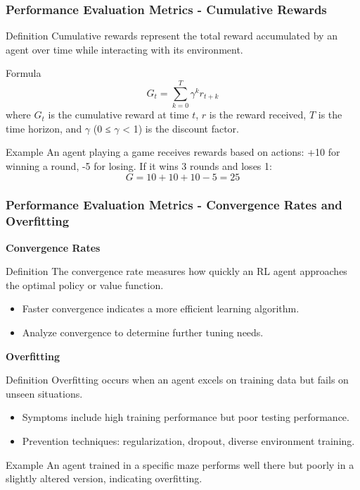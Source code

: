 \documentclass[aspectratio=169]{beamer}
\begin{document}
\begin{frame}[fragile]
    \frametitle{Performance Evaluation Metrics - Cumulative Rewards}
    \begin{block}{Definition}
        Cumulative rewards represent the total reward accumulated by an agent over time while interacting with its environment. 
    \end{block}
    
    \begin{block}{Formula}
        \begin{equation}
            G_t = \sum_{k=0}^{T} \gamma^k r_{t+k}
        \end{equation}
        where $G_t$ is the cumulative reward at time $t$, $r$ is the reward received, $T$ is the time horizon, and $\gamma$ (0 ≤ $\gamma$ < 1) is the discount factor.
    \end{block}
    
    \begin{block}{Example}
        An agent playing a game receives rewards based on actions: +10 for winning a round, -5 for losing. If it wins 3 rounds and loses 1:
        \begin{equation}
            G = 10 + 10 + 10 - 5 = 25
        \end{equation}
    \end{block}
\end{frame}

\begin{frame}[fragile]
    \frametitle{Performance Evaluation Metrics - Convergence Rates and Overfitting}
    
    \textbf{Convergence Rates}
    \begin{block}{Definition}
        The convergence rate measures how quickly an RL agent approaches the optimal policy or value function.
    \end{block}
    \begin{itemize}
        \item Faster convergence indicates a more efficient learning algorithm.
        \item Analyze convergence to determine further tuning needs.
    \end{itemize}
    
    \textbf{Overfitting}
    \begin{block}{Definition}
        Overfitting occurs when an agent excels on training data but fails on unseen situations.
    \end{block}
    \begin{itemize}
        \item Symptoms include high training performance but poor testing performance.
        \item Prevention techniques: regularization, dropout, diverse environment training.
    \end{itemize}
    
    \begin{block}{Example}
        An agent trained in a specific maze performs well there but poorly in a slightly altered version, indicating overfitting.
    \end{block}
\end{frame}
\end{document}
